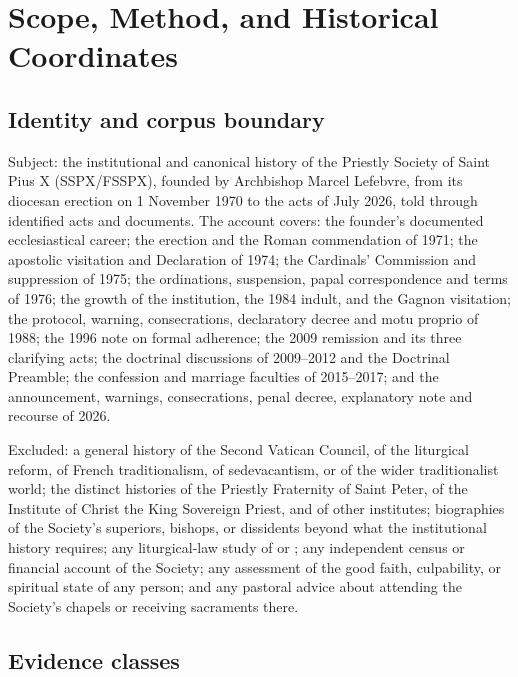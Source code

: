 \section{Scope, Method, and Historical Coordinates}

\subsection{Identity and corpus boundary}

Subject: the institutional and canonical history of the Priestly Society
of Saint Pius X (SSPX/FSSPX), founded by Archbishop Marcel Lefebvre, from
its diocesan erection on 1 November 1970 to the acts of July 2026, told
through identified acts and documents. The account covers: the founder's
documented ecclesiastical career; the erection and the Roman
commendation of 1971; the apostolic visitation and Declaration of 1974;
the Cardinals' Commission and suppression of 1975; the ordinations,
suspension, papal correspondence and terms of 1976; the growth of the
institution, the 1984 indult, and the Gagnon visitation; the protocol,
warning, consecrations, declaratory decree and motu proprio of 1988; the
1996 note on formal adherence; the 2009 remission and its three
clarifying acts; the doctrinal discussions of 2009--2012 and the
Doctrinal Preamble; the confession and marriage faculties of 2015--2017;
and the announcement, warnings, consecrations, penal decree, explanatory
note and recourse of 2026.

Excluded: a general history of the Second Vatican Council, of the
liturgical reform, of French traditionalism, of sedevacantism, or of the
wider traditionalist world; the distinct histories of the Priestly
Fraternity of Saint Peter, of the Institute of Christ the King Sovereign
Priest, and of other institutes; biographies of the Society's superiors,
bishops, or dissidents beyond what the institutional history requires;
any liturgical-law study of  or
; any independent census or financial account
of the Society; any assessment of the good faith, culpability, or
spiritual state of any person; and any pastoral advice about attending
the Society's chapels or receiving sacraments there.

\subsection{Evidence classes}

